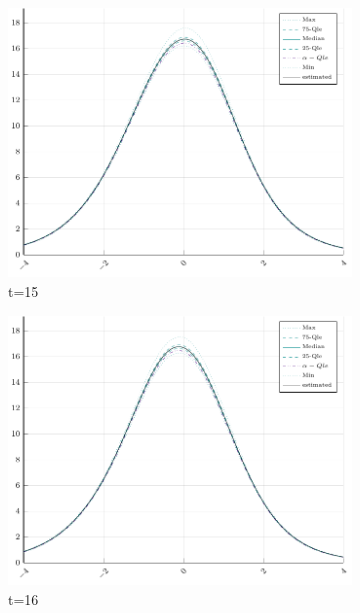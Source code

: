 \begin{figure}[H]
\begin{subfigure}[t]{0.31\textwidth}
		\includegraphics[width=\linewidth]{Figures/real/15_infoplot.pdf}
		\caption{t=15} 
	\end{subfigure}
	\begin{subfigure}[t]{0.31\textwidth}
		\centering
		\includegraphics[width=\linewidth]{Figures/real/16_infoplot.pdf}
		\caption{t=16} 
	\end{subfigure}\\
	\begin{subfigure}[t]{0.31\textwidth}
		\centering

\end{subfigure}
\end{figure}
